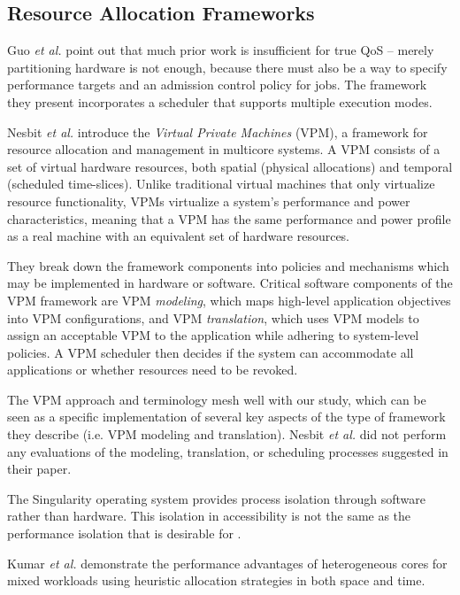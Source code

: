 \subsection{Resource Allocation Frameworks}

Guo \emph{et al.}\cite{1331730} point out that much prior work is insufficient for true QoS -- merely partitioning hardware is not enough, because there must also be a way to specify performance targets and an admission control policy for jobs.
The framework they present incorporates a scheduler that supports multiple execution modes.

Nesbit \emph{et al.}\cite{1436097} introduce the \emph{Virtual Private Machines} (VPM), a framework for resource allocation and management in multicore systems. A VPM consists of a set of virtual hardware resources, both spatial (physical allocations) and temporal (scheduled time-slices).  Unlike traditional virtual machines that only virtualize resource functionality, VPMs virtualize a system's performance and power characteristics, meaning that a VPM has the same performance and power profile as a real machine with an equivalent set of hardware resources.

They break down the framework components into policies and mechanisms which may be implemented in hardware or software. Critical software components of the VPM framework are VPM {\em modeling}, which maps high-level application objectives into VPM configurations, and VPM {\em translation}, which uses VPM models to assign an acceptable VPM to the application while adhering to system-level policies. A VPM scheduler then decides if the system can accommodate all applications or whether resources need to be revoked.

The VPM approach and terminology mesh well with our study, which can be seen as a specific implementation of several key aspects of the type of framework they describe (i.e. VPM modeling and translation). Nesbit \emph{et al.} did not perform any evaluations of the modeling, translation, or scheduling processes suggested in their paper.

The Singularity operating system\cite{aiken-mspc06} provides process isolation through software rather than hardware.  This isolation in accessibility is not the same as the performance isolation that is desirable for \pacora.

Kumar \emph{et al.}\cite{1006707} demonstrate the performance advantages of heterogeneous cores for mixed workloads using heuristic allocation strategies in both space and time.

